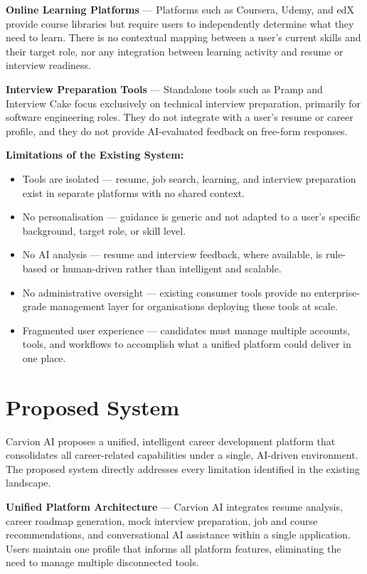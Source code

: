 \documentclass[12pt]{article}
\begin{document}
\textbf{Online Learning Platforms} --- Platforms such as Coursera, Udemy, and edX provide course libraries but require users to independently determine what they need to learn. There is no contextual mapping between a user's current skills and their target role, nor any integration between learning activity and resume or interview readiness.

\textbf{Interview Preparation Tools} --- Standalone tools such as Pramp and Interview Cake focus exclusively on technical interview preparation, primarily for software engineering roles. They do not integrate with a user's resume or career profile, and they do not provide AI-evaluated feedback on free-form responses.

\textbf{Limitations of the Existing System:}

\begin{itemize}
  \item Tools are isolated --- resume, job search, learning, and interview preparation exist in separate platforms with no shared context.
  \item No personalisation --- guidance is generic and not adapted to a user's specific background, target role, or skill level.
  \item No AI analysis --- resume and interview feedback, where available, is rule-based or human-driven rather than intelligent and scalable.
  \item No administrative oversight --- existing consumer tools provide no enterprise-grade management layer for organisations deploying these tools at scale.
  \item Fragmented user experience --- candidates must manage multiple accounts, tools, and workflows to accomplish what a unified platform could deliver in one place.
\end{itemize}

\clearpage
\section{Proposed System}

Carvion AI proposes a unified, intelligent career development platform that consolidates all career-related capabilities under a single, AI-driven environment. The proposed system directly addresses every limitation identified in the existing landscape.

\textbf{Unified Platform Architecture} --- Carvion AI integrates resume analysis, career roadmap generation, mock interview preparation, job and course recommendations, and conversational AI assistance within a single application. Users maintain one profile that informs all platform features, eliminating the need to manage multiple disconnected tools.
\end{document}

